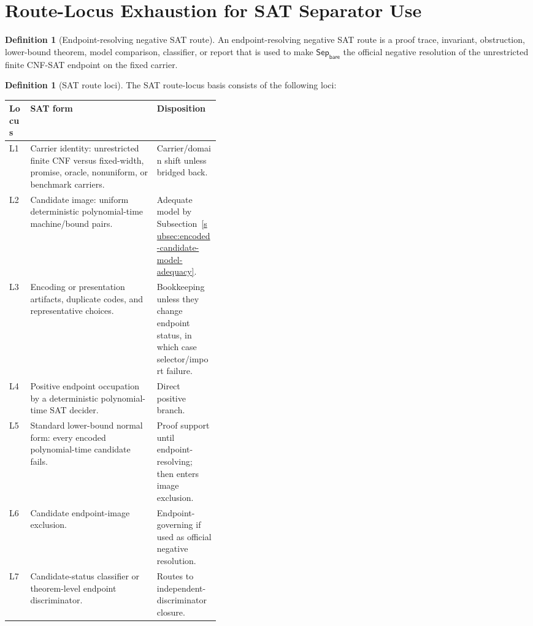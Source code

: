 \documentclass[11pt]{article}
\theoremstyle{definition}
\newtheorem{definition}[theorem]{Definition}
\theoremstyle{remark}
\newcommand{\SepBare}{\mathsf{Sep}_{\mathsf{bare}}}
\begin{document}
\section{Route-Locus Exhaustion for SAT Separator Use}\label{sec:sat-route-locus-exhaustion}

\begin{definition}[Endpoint-resolving negative SAT route]\label{def:endpoint-resolving-negative-sat-route}
An endpoint-resolving negative SAT route is a proof trace, invariant, obstruction, lower-bound theorem, model comparison, classifier, or report that is used to make \(\SepBare\) the official negative resolution of the unrestricted finite CNF-SAT endpoint on the fixed carrier.
\end{definition}

\begin{definition}[SAT route loci]\label{def:sat-route-loci}
The SAT route-locus basis consists of the following loci:
\begin{center}
\small
\begin{tabularx}{\linewidth}{>{\raggedright\arraybackslash}p{0.10\linewidth}>{\raggedright\arraybackslash}X>{\raggedright\arraybackslash}p{0.30\linewidth}}
\toprule
Locus & SAT form & Disposition \\
\midrule
L1 & Carrier identity: unrestricted finite CNF versus fixed-width, promise, oracle, nonuniform, or benchmark carriers. & Carrier/domain shift unless bridged back. \\
L2 & Candidate image: uniform deterministic polynomial-time machine/bound pairs. & Adequate model by Subsection~\ref{subsec:encoded-candidate-model-adequacy}. \\
L3 & Encoding or presentation artifacts, duplicate codes, and representative choices. & Bookkeeping unless they change endpoint status, in which case selector/import failure. \\
L4 & Positive endpoint occupation by a deterministic polynomial-time SAT decider. & Direct positive branch. \\
L5 & Standard lower-bound normal form: every encoded polynomial-time candidate fails. & Proof support until endpoint-resolving; then enters image exclusion. \\
L6 & Candidate endpoint-image exclusion. & Endpoint-governing if used as official negative resolution. \\
L7 & Candidate-status classifier or theorem-level endpoint discriminator. & Routes to independent-discriminator closure. \\

\end{tabularx}
\end{center}
\end{definition}
\end{document}
